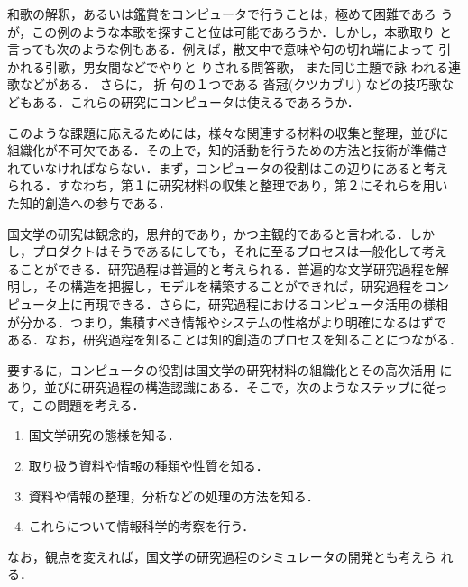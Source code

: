 和歌の解釈，あるいは鑑賞をコンピュータで行うことは，極めて困難であろ
うが，この例のような本歌を探すこと位は可能であろうか．しかし，本歌取り
と言っても次のような例もある．例えば，散文中で意味や句の切れ端によって
引かれる引歌\setcounter{footnote}{0}\footnotemark ，男女間などでやりと
りされる問答歌\hspace{-0.2mm}\setcounter{footnote}{0}\footnotemark ，
\hspace*{-1.3mm}
また同じ主題で詠
われる連歌\hspace{-0.2mm}\setcounter{footnote}{0}\footnotemark などがある．
\hspace*{-1.2mm}
さらに，
\hspace*{-1.3mm}
折
句\hspace{-0.2mm}\setcounter{footnote}{0}\footnotemark の１つである
沓冠(クツカブリ)\hspace{-1.2mm}
\setcounter{footnote}{0}\footnotemark などの技巧歌な
どもある．これらの研究にコンピュータは使えるであろうか．

このような課題に応えるためには，様々な関連する材料の収集と整理，並びに
組織化が不可欠である．その上で，知的活動を行うための方法と技術が準備さ
れていなければならない．まず，コンピュータの役割はこの辺りにあると考え
られる．すなわち，第１に研究材料の収集と整理であり，第２にそれらを用い
た知的創造への参与である．

国文学の研究は観念的，思弁的であり，かつ主観的であると言われる．しか
し，プロダクトはそうであるにしても，それに至るプロセスは一般化して考え
ることができる．研究過程は普遍的と考えられる．普遍的な文学研究過程を解
明し，その構造を把握し，モデルを構築することができれば，研究過程をコン
ピュータ上に再現できる．さらに，研究過程におけるコンピュータ活用の様相
が分かる．つまり，集積すべき情報やシステムの性格がより明確になるはずで
ある．なお，研究過程を知ることは知的創造のプロセスを知ることにつながる．

要するに，コンピュータの役割は国文学の研究材料の組織化とその高次活用
にあり，並びに研究過程の構造認識にある．そこで，次のようなステップに従っ
て，この問題を考える．
\begin{enumerate}
\item 国文学研究の態様を知る．
\item 取り扱う資料や情報の種類や性質を知る．
\item 資料や情報の整理，分析などの処理の方法を知る．
\item これらについて情報科学的考察を行う．
\end{enumerate}

なお，観点を変えれば，国文学の研究過程のシミュレータの開発とも考えら
れる．


